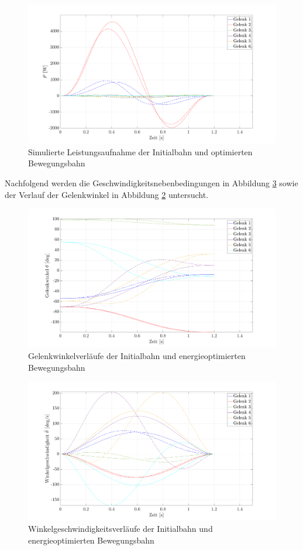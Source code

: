 %
\begin{figure}[tbph]
	\centering
	\includegraphics[width=1\linewidth]{images/Optimierungsergebnisse_up/popt}
	\caption{Simulierte Leistungsaufnahme der Initialbahn und optimierten Bewegungsbahn}
	\label{fig:popt}
\end{figure}
%
Nachfolgend werden die Geschwindigkeitsnebenbedingungen in Abbildung \ref{fig:velopt} sowie der Verlauf der Gelenkwinkel in Abbildung \ref{fig:posopt} untersucht. 
%
\begin{figure}[tbph]
	\centering
	\includegraphics[width=1\linewidth]{images/Optimierungsergebnisse_up/posopt}
	\caption{Gelenkwinkelverläufe der Initialbahn und energieoptimierten Bewegungsbahn}
	\label{fig:posopt}
\end{figure}
%
\begin{figure}[tbph]
	\centering
	\includegraphics[width=1\linewidth]{images/Optimierungsergebnisse_up/velopt}
	\caption{Winkelgeschwindigkeitsverläufe der Initialbahn und energieoptimierten Bewegungsbahn}
	\label{fig:velopt}
\end{figure}
